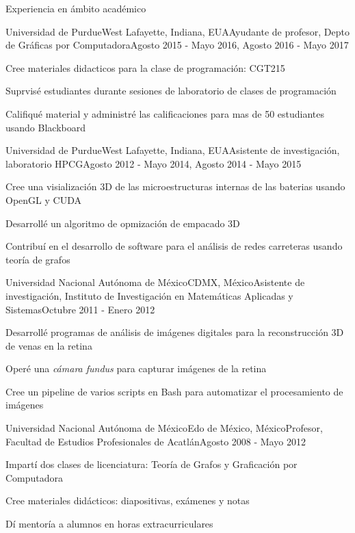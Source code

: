 \documentclass{resume} %
\begin{document}
\begin{rSection}{Experiencia en ámbito académico}

	\begin{rSubsection}{Universidad de Purdue}{West Lafayette, Indiana, EUA}{Ayudante de profesor, Depto de Gráficas por Computadora}{Agosto 2015 - Mayo 2016, Agosto 2016 - Mayo 2017}
	\item Cree materiales didacticos para la clase de programación: CGT215
	\item Suprvisé estudiantes durante sesiones de laboratorio de clases de programación
	\item Califiqué material y administré las calificaciones para mas de 50 estudiantes usando Blackboard
	\end{rSubsection}

	\begin{rSubsection}{Universidad de Purdue}{West Lafayette, Indiana, EUA}{Asistente de investigación, laboratorio HPCG}{Agosto 2012 - Mayo 2014, Agosto 2014 - Mayo 2015}
	\item Cree una visialización 3D de las microestructuras internas de las baterias usando OpenGL y CUDA
	\item Desarrollé un algoritmo de opmización de empacado 3D
	\item Contribuí en el desarrollo de software para el análisis de redes carreteras usando teoría de grafos
	\end{rSubsection}
	
	\begin{rSubsection}{Universidad Nacional Autónoma de México}{CDMX, México}{Asistente de investigación, Instituto de Investigación en Matemáticas Aplicadas y Sistemas}{Octubre 2011 - Enero 2012}
	\item Desarrollé programas de análisis de imágenes digitales para la reconstrucción 3D de venas en la retina
	\item Operé una \emph{cámara fundus} para capturar imágenes de la retina
	\item Cree un pipeline de varios scripts en Bash para automatizar el procesamiento de imágenes
	\end{rSubsection}
	
	\begin{rSubsection}{Universidad Nacional Autónoma de México}{Edo de México, México}{Profesor, Facultad de Estudios Profesionales de Acatlán}{Agosto 2008 - Mayo 2012}
	\item Impartí dos clases de licenciatura: Teoría de Grafos y Graficación por Computadora
	\item Cree materiales didácticos: diapositivas, exámenes y notas
	\item Dí mentoría a alumnos en horas extracurriculares
	\end{rSubsection}
	

\end{rSection}
\end{document}
